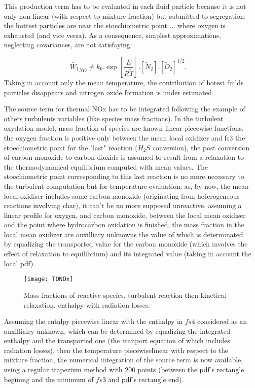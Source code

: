 This production term has to be evaluated in each fluid particle because it is not
only non linear (with respect to mixture fraction) but submitted to segregation:
the hottest particles are near the stoechiometric point ... where oxygen is
exhausted (and vice versa). As a consequence, simplest approximations, neglecting
covariances, are not satisfaying:

\begin{equation*}
 \widetilde{W_1}_{NO} \neq k_0  . \exp \left[\frac{E}{R\tilde{T}}\right].\left[ \widetilde{N}_{2} \right].\left[\widetilde{O}_{2}\right]^{1/2} .
\end{equation*}
Taking in account only the mean temperature, the contribution of hotest fuilds particles disappears and nitrogen oxide formation is under estimated.

The source term for thermal NOx has to be integrated following the example of
others turbulents variables (like species mass fractions). In the turbulent
oxydation model, mass fraction of species are known linear piecewise functions,
the oxygen fraction is positive only between the mean local oxidizer and fs3 the
stoechiometric point for the "last" reaction ($H_{2}S$ conversion), the post
conversion of carbon monoxide to carbon dioxide is assumed to result from a
relaxation to the thermodynamical equilibrium computed with mean values. The
stoechiometric point corresponding to this last reaction is no more necessary to
the turbulent computation but for temperature evaluation: as, by now, the mean
local oxidiser includes some carbon monoxide (originating from heterogeneous
reactions involving char), it can't be no more supposed unreactive, assuming a
linear profile for oxygen, and carbon monoxide, between the local mean oxidiser
and the point where hydrocarbon oxidation is finished, the mass fraction in the
local mean oxidizer are auxilliary unknowns the value of which is determinated
by equalizing the transported value for the carbon monoxide (which involves the
effect of relaxation to equilibrium) and its integrated value (taking in account
the local pdf).


\begin{figure}[!htpb]
\centerline{\texttt{[image: TONOx]}}
\caption{Mass fractions of reactive species, turbulent reaction then kinetical relaxation, enthalpy with radiation losses.}
\end{figure}

Assuming the entalpy piecewise linear with the enthalpy in $fs4$ considered as an
auxilliairy unknown, which can be determined by equalizing the integrated
enthalpy and the transported one (the tranport equation of which includes
radiation losses), then the temperature piecewiselinear with respect to the
mixture fraction, the numerical integration of the source term is now available,
using a regular trapezium method with 200 points (between the pdf's rectangle
begining and the minimum of $fs3$ and pdf's rectangle end).

